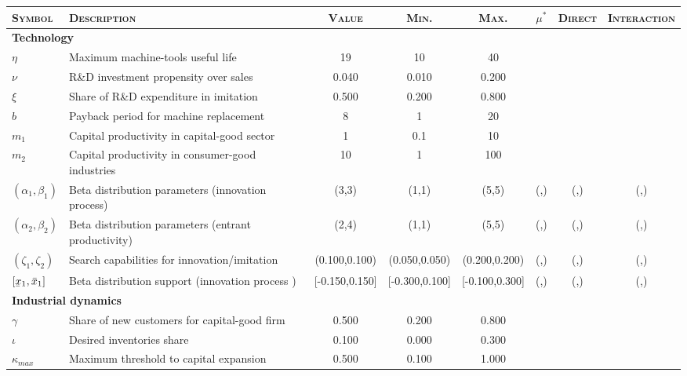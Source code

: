 \documentclass[a4paper,11pt]{article}
\newcommand\munderbar[1]{%
	\underaccent{\bar}{#1}}
\begin{document}
\begin{appendices}
\begin{landscape}
\begin{table}[ht]
\centering
\footnotesize
\begin{tabular}{llcccccc}
\toprule
\textsc{Symbol} 				& \textsc{Description} 									& \textsc{Value}	& \textsc{Min.}	& \textsc{Max.}	& \textsc{$\mu^*$}	& \textsc{Direct}	& \textsc{Interaction} \\
\midrule
\multicolumn{2}{l}{\textbf{Technology}} \\
$\eta$							& Maximum machine-tools useful life						& 19				& 10			& 40			& 					& 					& 	 \\
$\nu$ 							& R\&D investment propensity over sales					& 0.040				& 0.010			& 0.200			& 					& 					& 	 \\
$\xi$ 							& Share of R\&D expenditure in imitation				& 0.500				& 0.200			& 0.800			& 					& 					& 	 \\
$b$								& Payback period for machine replacement				& 8					& 1				& 20			& 					& 					& 	 \\
$m_1$ 							& Capital productivity in capital-good sector			& 1					& 0.1			& 10			& 					& 					& 	 \\
$m_2$ 							& Capital productivity in consumer-good industries		& 10					& 1				& 100			& 					& 					& 	 \\
$(\alpha_1,\beta_1)$ 			& Beta distribution parameters (innovation process) 	& (3,3)				& (1,1)			& (5,5)			& (,)				& (,)				& (,) \\
$(\alpha_2,\beta_2)$ 			& Beta distribution parameters (entrant productivity)	& (2,4)				& (1,1)			& (5,5)			& (,)				& (,)				& (,) \\
$(\zeta_1,\zeta_2)$				& Search capabilities for innovation/imitation 			& (0.100,0.100)		& (0.050,0.050)	& (0.200,0.200)	& (,)				& (,)				& (,) \\
$[\munderbar{x}_1,\bar{x}_1]$	& Beta distribution support (innovation process )		& [-0.150,0.150]	& [-0.300,0.100]& [-0.100,0.300]& (,)				& (,)				& (,) \\
\midrule
\multicolumn{2}{l}{\textbf{Industrial dynamics}} \\
$\gamma$ 						& Share of new customers for capital-good firm			& 0.500				& 0.200			& 0.800			& 					& 					& 	 \\
$\iota$ 						& Desired inventories share								& 0.100				& 0.000			& 0.300			& 					& 					& 	 \\
$\kappa_{max}$					& Maximum threshold to capital expansion				& 0.500				& 0.100			& 1.000			& 					& 					& 	 \\

\end{tabular}
\end{table}
\end{landscape}
\end{appendices}
\end{document}
